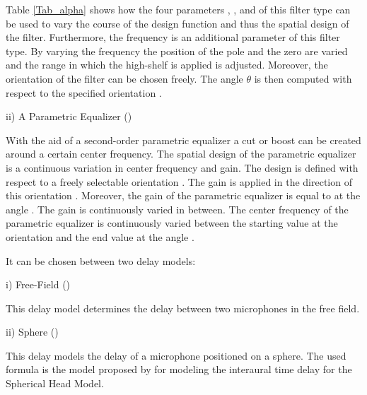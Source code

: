 Table \ref{Tab_alpha} shows how the four parameters , ,
 and  of this filter type can be used to vary the course of
the design function and thus the spatial design of the filter.
Furthermore, the frequency  is an additional parameter of this filter
type. By varying the frequency  the position of the pole and the zero are
varied and the range in which the high-shelf is applied is adjusted.
Moreover, the orientation  of the filter can be chosen freely. The angle
$\theta$ is then computed with respect to the specified orientation .




ii) A Parametric Equalizer ()

With the aid of a second-order parametric equalizer a cut or boost can be created around
a certain center frequency. The spatial design of the parametric equalizer is a continuous
variation in center frequency and gain. The design is defined with respect to a freely
selectable orientation .
The gain  is applied in the direction of this orientation .
Moreover, the gain of the parametric equalizer is equal to  at the angle
. The gain is continuously varied in between.
The center frequency of the parametric equalizer is continuously varied between the starting
value  at the orientation  and the end value
 at the angle .




It can be chosen between two delay models:

i) Free-Field ()

This delay model determines the delay between two microphones in the free field.

ii) Sphere ()

This delay models the delay of a microphone positioned on a sphere. The used formula is
the model proposed by \citet{BrownDuda} for modeling the interaural time delay for the
Spherical Head Model.

